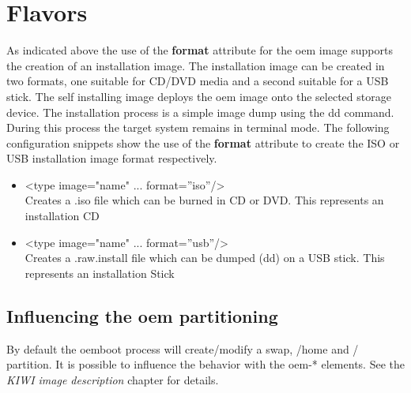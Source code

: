 \section{Flavors}

As indicated above the use of the \textbf{format} attribute for the
oem image supports the creation of an installation image. The installation 
image can be created in two formats, one suitable for CD/DVD media and a 
second suitable for a USB stick. The self installing image deploys the oem
image onto the selected storage device. The installation process is a 
simple image dump using the dd command. During this process the target system
remains in terminal mode. The following configuration snippets show the 
use of the \textbf{format} attribute to create the ISO or USB installation
image format respectively.

\begin{itemize}
\item <type image="name" ... format=''iso''/>\\
      Creates a .iso file which can be burned in CD or DVD. This
      represents an installation CD
\item <type image="name" ... format=''usb''/>\\
      Creates a .raw.install file which can be dumped (dd) on a
      USB stick. This represents an installation Stick
\end{itemize}

\subsection{Influencing the oem partitioning}

By default the oemboot process will create/modify a swap, /home and /
partition. It is possible to influence the behavior with the
oem-* elements. See the \textit{KIWI image description} chapter for details.


